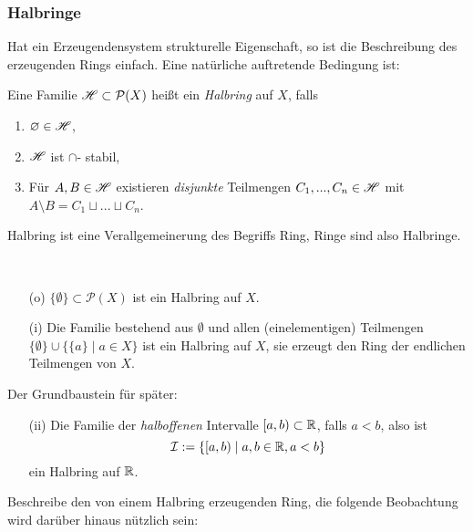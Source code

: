 \subsubsection{Halbringe}
Hat ein Erzeugendensystem strukturelle Eigenschaft, so ist die Beschreibung des erzeugenden Rings einfach. Eine natürliche auftretende Bedingung ist:
\begin{definition}
\begin{mdframed}
Eine Familie $\mathscr{H}\subset \mathcal{P}(X)$ heißt ein \emph{Halbring} auf $X$, falls
\begin{enumerate}[(\roman*), topsep=3pt, itemsep=0pt]
	\item $\varnothing \in \mathscr{H}$,
	\item $\mathscr{H}$ ist $\cap$- stabil,
	\item Für $A,B \in \mathscr{H}$ existieren \emph{disjunkte} Teilmengen $C_1,...,C_n \in \mathscr{H}$ mit $A\setminus B = C_1 \sqcup ...\sqcup C_n$.
\end{enumerate}
\end{mdframed}
\end{definition}
\begin{remark}
Halbring ist eine Verallgemeinerung des Begriffs Ring, Ringe sind also Halbringe.
\end{remark}
\begin{example} \
\begin{enumerate}
	\item[(o)] $\{ \emptyset\} \subset \mathcal{P}(X)$ ist ein Halbring auf $X$.
	\item[(i)] Die Familie bestehend aus $\emptyset$ und allen (einelementigen) Teilmengen $\{\emptyset\} \cup \{ \{a\} \mid a \in X \}$  ist ein Halbring auf $X$, sie erzeugt den Ring der endlichen Teilmengen von $X$.
\end{enumerate}
Der Grundbaustein für später:
\begin{mdframed}
\begin{enumerate}
	\item[(ii)] Die Familie der \emph{halboffenen} Intervalle $[a,b) \subset \mathbb{R}$, falls $a<b$, also ist $$\mathcal{I} := \{[a,b) \mid a,b \in \mathbb{R}, a<b\}$$  ein Halbring auf $\mathbb{R}$.
\end{enumerate}
\end{mdframed}
\end{example}
Beschreibe den von einem Halbring erzeugenden Ring, die folgende Beobachtung wird darüber hinaus nützlich sein:

